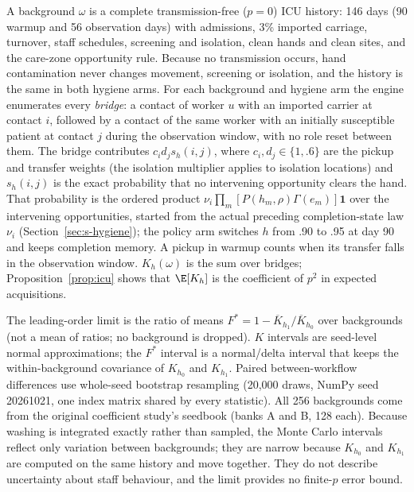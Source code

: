 A background $\omega$ is a complete transmission-free ($p=0$) ICU history: 146
days (90 warmup and 56 observation days) with admissions, 3\% imported carriage,
turnover, staff schedules, screening and isolation, clean hands and clean sites,
and the care-zone opportunity rule. Because no transmission occurs, hand
contamination never changes movement, screening or isolation, and the history
is the same in both hygiene arms. For each background and hygiene arm the
engine enumerates every \emph{bridge}: a contact of worker $u$ with an imported
carrier at contact $i$, followed by a contact of the same worker with an
initially susceptible patient at contact $j$ during the observation window,
with no role reset between them. The bridge contributes $c_id_js_h(i,j)$, where
$c_i,d_j\in\{1,.6\}$ are the pickup and transfer weights (the isolation
multiplier applies to isolation locations) and $s_h(i,j)$ is the exact
probability that no intervening opportunity clears the hand. That probability
is the ordered product $\nu_i\prod_m[P(h_m,\rho)\Gamma(e_m)]\boldsymbol 1$ over the
intervening opportunities, started from the actual preceding completion-state
law $\nu_i$ (Section~\ref{sec:s-hygiene}); the policy arm switches $h$ from .90
to .95 at day 90 and keeps completion memory. A pickup in warmup counts when its
transfer falls in the observation window. $K_h(\omega)$ is the sum over bridges;
Proposition~\ref{prop:icu} shows that $\E[K_h]$ is the coefficient of $p^2$ in
expected acquisitions.

The leading-order limit is the ratio of means
$F^*=1-\overline K_{h_1}/\overline K_{h_0}$ over backgrounds (not a mean of
ratios; no background is dropped). $K$ intervals are seed-level normal
approximations; the $F^*$ interval is a normal/delta interval that keeps the
within-background covariance of $K_{h_0}$ and $K_{h_1}$. Paired between-workflow
differences use whole-seed bootstrap resampling (20,000 draws, NumPy seed
20261021, one index matrix shared by every statistic). All 256 backgrounds come
from the original coefficient study's seedbook (banks A and B, 128 each).
Because washing is integrated exactly rather than sampled, the Monte Carlo
intervals reflect only variation between backgrounds; they are narrow because
$K_{h_0}$ and $K_{h_1}$ are computed on the same history and move together.
They do not describe uncertainty about staff behaviour, and the limit provides
no finite-$p$ error bound.

